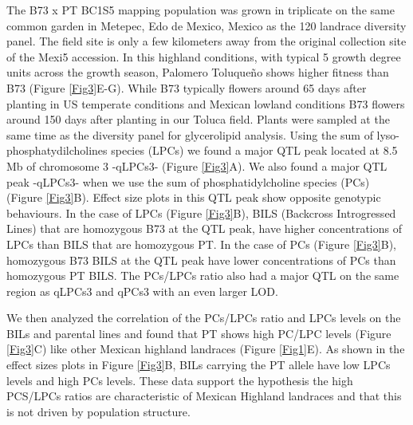 \documentclass[9pt,twocolumn,twoside]{BioRxiv}
\begin{document}
The B73 x PT BC1S5 mapping population was grown in triplicate on the same common garden in Metepec, Edo de Mexico, Mexico as the 120 landrace diversity panel. The field site is only a few kilometers away from the original collection site of the Mexi5 accession. In this highland conditions, with typical 5 growth degree units across the growth season, Palomero Toluqueño shows higher fitness than B73 (Figure \ref{Fig3}E-G). While B73 typically flowers around 65 days after planting in US temperate conditions and Mexican lowland conditions B73 flowers around 150 days after planting in our Toluca field. 
Plants were sampled at the same time as the diversity panel for glycerolipid analysis.  
Using the sum of lyso-phosphatydilcholines species (LPCs) we found a major QTL peak located at 8.5 Mb of chromosome 3 -qLPCs3- (Figure \ref{Fig3}A). 
We also found a major QTL peak -qLPCs3- when we use the sum of phosphatidylcholine species (PCs) (Figure \ref{Fig3}B). 
Effect size plots in this QTL peak show opposite genotypic behaviours. 
In the case of LPCs (Figure \ref{Fig3}B), BILS (Backcross Introgressed Lines) that are homozygous B73 at the QTL peak, have higher concentrations of LPCs than BILS that are homozygous PT. In the case of PCs (Figure \ref{Fig3}B), homozygous B73 BILS at the QTL peak have lower concentrations of PCs than homozygous PT BILS. 
The PCs/LPCs ratio also had a major QTL on the same region as qLPCs3 and qPCs3 with an even larger LOD. 

We then analyzed the correlation of the PCs/LPCs ratio and LPCs levels on the BILs and parental lines and found that PT shows high PC/LPC levels (Figure \ref{Fig3}C) like other Mexican highland landraces (Figure \ref{Fig1}E). 
As shown in the effect sizes plots in  Figure \ref{Fig3}B, BILs carrying the PT allele have low LPCs levels and high PCs levels. These data support the hypothesis the high PCS/LPCs ratios are characteristic of Mexican Highland landraces and that this is not driven by population structure. 
\end{document}
